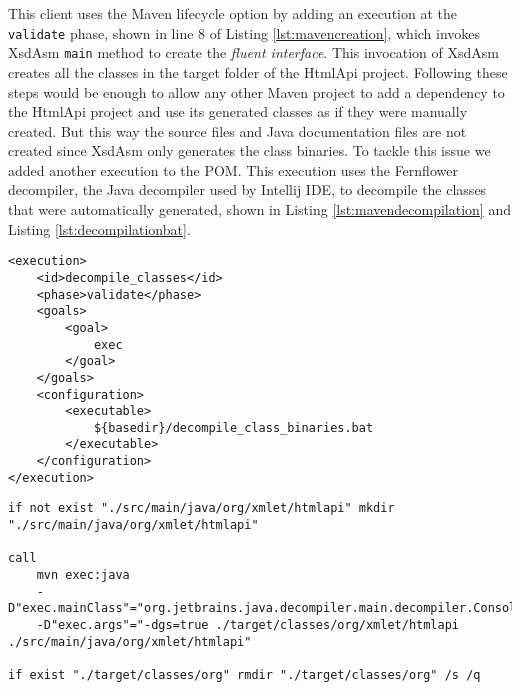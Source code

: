 \noindent
This client uses the Maven lifecycle option by adding an execution at the \texttt{validate} phase, shown in line 8 of Listing \ref{lst:mavencreation}, which invokes XsdAsm \texttt{main} method to create the \textit{fluent interface}. This invocation of XsdAsm creates all the classes in the target folder of the HtmlApi project. Following these steps would be enough to allow any other Maven project to add a dependency to the HtmlApi project and use its generated classes as if they were manually created. But this way the source files and Java documentation files are not created since XsdAsm only generates the class binaries. To tackle this issue we added another execution to the \ac{POM}. This execution uses the Fernflower\cite{fernflower} decompiler, the Java decompiler used by Intellij\cite{intellij} \ac{IDE}, to decompile the classes that were automatically generated, shown in Listing \ref{lst:mavendecompilation} and Listing \ref{lst:decompilationbat}.

\bigskip


\begin{minipage}{\linewidth}
\begin{lstlisting}[caption={Maven - Decompiling Classes Using the Fernflower Plugin},label={lst:mavendecompilation}]
<execution>
    <id>decompile_classes</id>
    <phase>validate</phase>
    <goals>
        <goal>
            exec
        </goal>
    </goals>
    <configuration>
        <executable>
            ${basedir}/decompile_class_binaries.bat
        </executable>
    </configuration>
</execution>
\end{lstlisting}
\end{minipage}


\begin{minipage}{\linewidth}
\begin{lstlisting}[caption={Maven - The Code to Decompile the Generated Classes (decompile\_class\_binaries.bat)},label={lst:decompilationbat}]
if not exist "./src/main/java/org/xmlet/htmlapi" mkdir "./src/main/java/org/xmlet/htmlapi"

call 
    mvn exec:java 
    -D"exec.mainClass"="org.jetbrains.java.decompiler.main.decompiler.ConsoleDecompiler" 
    -D"exec.args"="-dgs=true ./target/classes/org/xmlet/htmlapi ./src/main/java/org/xmlet/htmlapi"

if exist "./target/classes/org" rmdir "./target/classes/org" /s /q
\end{lstlisting}
\end{minipage}

